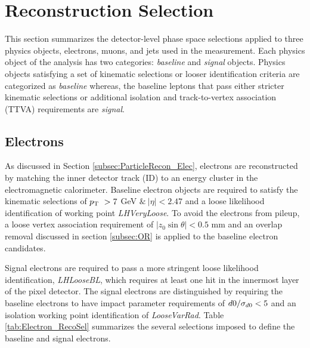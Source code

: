 \section{Reconstruction Selection}
\label{sec:ObjReconstruction}

This section summarizes the detector-level phase space selections applied to three physics objects, electrons, muons, and jets used in the measurement. Each physics object of the analysis has two categories: \textit{baseline} and \textit{signal} objects. Physics objects satisfying a set of kinematic selections or looser identification criteria are categorized as \textit{baseline} whereas, the baseline leptons that pass either stricter kinematic selections or additional isolation and track-to-vertex association (TTVA) requirements are \textit{signal}.

\subsection{Electrons}
\label{subsec:ElecRecon}

As discussed in Section \ref{subsec:ParticleRecon_Elec}, electrons are reconstructed by matching the inner detector track (ID) to an energy cluster in the electromagnetic calorimeter. Baseline electron objects are required to satisfy the kinematic selections of $p_{\textrm{T} ~} > 7$ GeV $ \&~ |\eta| < 2.47$ and a loose likelihood identification of working point \textit{LHVeryLoose}. To avoid the electrons from pileup, a loose vertex association requirement of $|z_{0}\sin\theta| < 0.5 $ mm and an overlap removal discussed in section \ref{subsec:OR} is applied to the baseline electron candidates.

Signal electrons are required to pass a more stringent loose likelihood identification, \textit{LHLooseBL}, which requires at least one hit in the innermost layer of the pixel detector. The signal electrons are distinguished by requiring the baseline electrons to have impact parameter requirements of $d0/ \sigma_{d0} < 5$ and an isolation working point identification of \textit{LooseVarRad}. Table \ref{tab:Electron_RecoSel} summarizes the several selections imposed to define the baseline and signal electrons.

